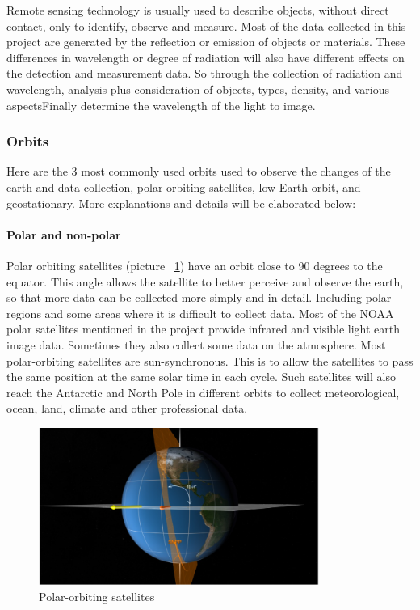 \documentclass[conference]{IEEEtran}
\begin{document}
Remote sensing technology is usually used to describe objects, without direct contact, only to identify, observe and measure. Most of the data collected in this project are generated by the reflection or emission of objects or materials. These differences in wavelength or degree of radiation will also have different effects on the detection and measurement data. So through the collection of radiation and wavelength, analysis plus consideration of objects, types, density, and various aspects\cite{earthdata28:online}Finally determine the wavelength of the light to image.

\subsubsection{Orbits} 
Here are the 3 most commonly used orbits used to observe the changes of the earth and data collection, polar orbiting satellites, low-Earth orbit, and geostationary. More explanations and details will be elaborated below:

\paragraph{Polar and non-polar}
    
Polar orbiting satellites (picture ~\ref{satellites}) have an orbit close to 90 degrees to the equator. This angle allows the satellite to better perceive and observe the earth, so that more data can be collected more simply and in detail. Including polar regions and some areas where it is difficult to collect data\cite{WhatisRe36:online}. Most of the NOAA polar satellites mentioned in the project provide infrared and visible light earth image data. Sometimes they also collect some data on the atmosphere\cite{side357:online}. Most polar-orbiting satellites are sun-synchronous. This is to allow the satellites to pass the same position at the same solar time in each cycle. Such satellites will also reach the Antarctic and North Pole in different orbits to collect meteorological, ocean, land, climate and other professional data.

\begin{figure}[htbp]
    \centerline{\includegraphics[width=260pt]{images/1.1.1.png}}
    \caption{Polar-orbiting satellites}
    \label{satellites}
\end{figure}
 
\end{document}
